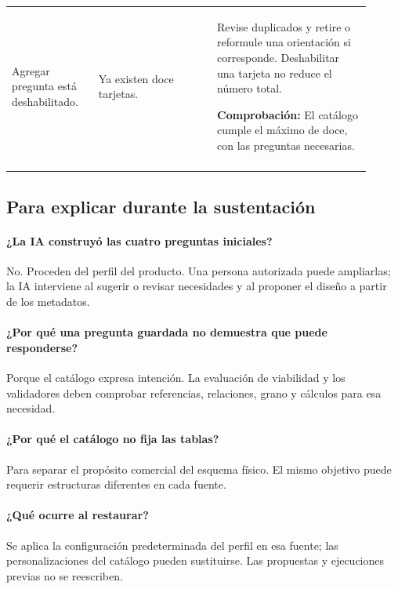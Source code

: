 \begin{longtable}{@{}>{\RaggedRight\arraybackslash}p{0.22\linewidth}>{\RaggedRight\arraybackslash}p{0.3\linewidth}>{\RaggedRight\arraybackslash}p{0.39\linewidth}@{}}
\addlinespace[3pt]
Agregar pregunta está deshabilitado. & Ya existen doce tarjetas. & Revise duplicados y retire o reformule una orientación si corresponde. Deshabilitar una tarjeta no reduce el número total.\par\smallskip\textbf{Comprobación:} El catálogo cumple el máximo de doce, con las preguntas necesarias. \\
\addlinespace[3pt]
\end{longtable}
\endgroup

\subsection{Para explicar durante la sustentación}
\paragraph{¿La IA construyó las cuatro preguntas iniciales?} No. Proceden del perfil del producto. Una persona autorizada puede ampliarlas; la IA interviene al sugerir o revisar necesidades y al proponer el diseño a partir de los metadatos.

\paragraph{¿Por qué una pregunta guardada no demuestra que puede responderse?} Porque el catálogo expresa intención. La evaluación de viabilidad y los validadores deben comprobar referencias, relaciones, grano y cálculos para esa necesidad.

\paragraph{¿Por qué el catálogo no fija las tablas?} Para separar el propósito comercial del esquema físico. El mismo objetivo puede requerir estructuras diferentes en cada fuente.

\paragraph{¿Qué ocurre al restaurar?} Se aplica la configuración predeterminada del perfil en esa fuente; las personalizaciones del catálogo pueden sustituirse. Las propuestas y ejecuciones previas no se reescriben.

